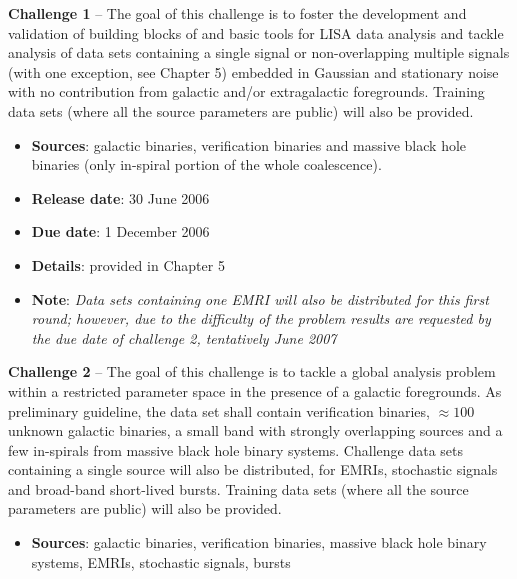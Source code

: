 \documentclass[11pt]{report}
\begin{document}
\begin{description}

\item{{\bf Challenge 1}} -- The goal of this challenge is to foster the development and validation of building blocks of and basic tools for LISA data analysis and tackle analysis of data sets containing a single signal or non-overlapping multiple signals (with one exception, see Chapter 5) embedded in Gaussian and stationary noise with no contribution from galactic and/or extragalactic foregrounds. Training data sets (where all the source parameters are public) will also be provided. 


\begin{itemize} 

\item {\bf Sources}: galactic binaries, verification binaries and massive black hole binaries (only in-spiral portion of the whole coalescence).


\item {\bf Release date}: 30 June 2006

\item {\bf Due date}: 1 December 2006

\item {\bf Details}: provided in Chapter 5

\item {\bf Note}: {\em Data sets containing one EMRI will also be distributed for this first round; however, due to the difficulty of the problem results are requested by the due date of challenge 2, tentatively June 2007}

\end{itemize}

\item{{\bf Challenge 2}} -- The goal of this challenge is to tackle a global analysis problem within a restricted parameter space in the presence of a galactic foregrounds. As preliminary guideline, the data set shall contain verification binaries, $\approx 100$ unknown galactic binaries, a small band with strongly overlapping sources and a few in-spirals from massive black hole binary systems. Challenge data sets containing a single source will also be distributed, for EMRIs, stochastic signals and broad-band short-lived bursts. Training data sets (where all the source parameters are public) will also be provided. 

\begin{itemize}

\item {\bf Sources}: galactic binaries, verification binaries, massive black hole binary systems, EMRIs, stochastic signals, bursts



\end{itemize}
\end{description}
\end{document}
